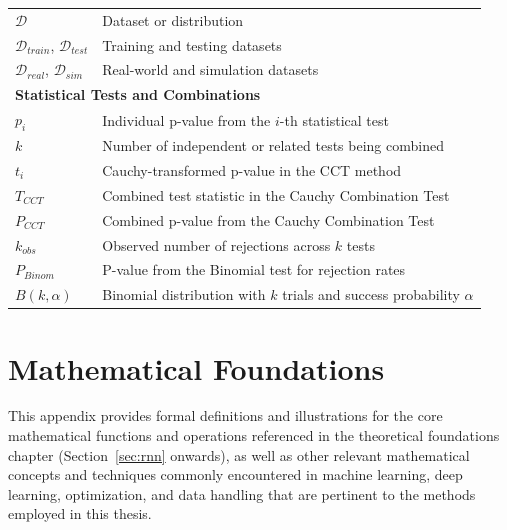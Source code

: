 \begin{appendices}
\begin{longtable}{p{}p{}}
    \midrule
    $\mathcal{D}$                               & Dataset or distribution                                                              \\
    $\mathcal{D}_{train}$, $\mathcal{D}_{test}$ & Training and testing datasets                                                        \\
    $\mathcal{D}_{real}$, $\mathcal{D}_{sim}$   & Real-world and simulation datasets                                                   \\
    \midrule
    \multicolumn{2}{l}{\textbf{Statistical Tests and Combinations}}                                                                    \\
    \midrule
    $p_i$                                       & Individual p-value from the $i$-th statistical test                                  \\
    $k$                                         & Number of independent or related tests being combined                                \\
    $t_i$                                       & Cauchy-transformed p-value in the CCT method                                         \\
    $T_{CCT}$                                   & Combined test statistic in the Cauchy Combination Test                               \\
    $P_{CCT}$                                   & Combined p-value from the Cauchy Combination Test                                    \\
    $k_{obs}$                                   & Observed number of rejections across $k$ tests                                       \\
    $P_{Binom}$                                 & P-value from the Binomial test for rejection rates                                   \\
    $B(k, \alpha)$                              & Binomial distribution with $k$ trials and success probability $\alpha$               \\
  \end{longtable}
  \endgroup

  \section{Mathematical Foundations}
  \label{app:math_foundations}

  This appendix provides formal definitions and illustrations for the core mathematical functions and operations referenced in the theoretical foundations chapter (Section~\ref{sec:rnn} onwards), as well as other relevant mathematical concepts and techniques commonly encountered in machine learning, deep learning, optimization, and data handling that are pertinent to the methods employed in this thesis.



\end{appendices}
